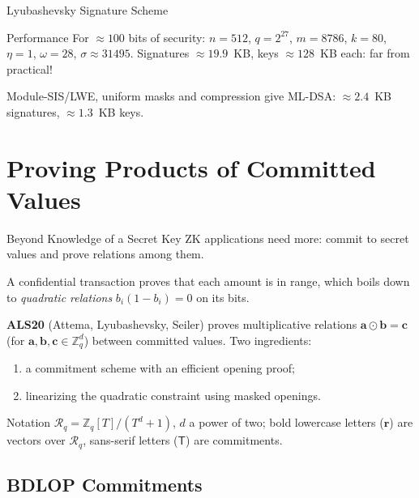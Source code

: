 \documentclass{zkdl-presentation-template}
\begin{document}
\begin{frame}{Lyubashevsky Signature Scheme}
        \begin{alertblock}{Performance}
            For $\approx 100$ bits of security: $n = 512$, $q = 2^{27}$, $m = 8786$, $k = 80$, $\eta = 1$, $\omega = 28$, $\sigma \approx 31495$. Signatures $\approx 19.9$~KB, keys $\approx 128$~KB each: far from practical!
        \end{alertblock}
        \pause
        Module-SIS/LWE, uniform masks and compression give ML-DSA: $\approx 2.4$~KB signatures, $\approx 1.3$~KB keys.
    \end{frame}

    \section[Product Proofs]{Proving Products of Committed Values}

    \begin{frame}{Beyond Knowledge of a Secret Key}
        ZK applications need more: commit to secret values and prove relations among them.
        \begin{example}
            A confidential transaction proves that each amount is in range, which boils down to \emph{quadratic relations} $b_i(1-b_i) = 0$ on its bits.
        \end{example}
        \pause

        \textbf{ALS20} (Attema, Lyubashevsky, Seiler) proves multiplicative relations $\mathbf{a} \odot \mathbf{b} = \mathbf{c}$ (for $\mathbf{a},\mathbf{b},\mathbf{c} \in \mathbb{Z}_q^d$) between committed values. Two ingredients:
        \begin{enumerate}
            \item a commitment scheme with an efficient opening proof;
            \item linearizing the quadratic constraint using masked openings.
        \end{enumerate}
        \pause

        \begin{block}{Notation}
            $\mathcal{R}_q = \mathbb{Z}_q[T]/(T^d+1)$, $d$ a power of two; bold lowercase letters ($\mathbf{r}$) are vectors over $\mathcal{R}_q$, sans-serif letters ($\mathsf{T}$) are commitments.
        \end{block}
    \end{frame}

    \subsection{BDLOP Commitments}
\end{document}
